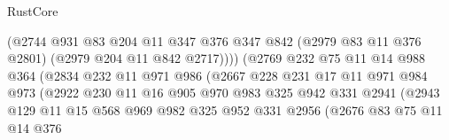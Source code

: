 \begin{lexlean}{RustCore}
\begin{coremodule}
                                    (@2744
                                      @931
                                      @83
                                      @204
                                      @11
                                      @347
                                      @376
                                      @347
                                      @842
                                      (@2979 @83 @11 @376 @2801)
                                      (@2979 @204 @11 @842 @2717))))
                                (@2769
                                  @232
                                  @75
                                  @11
                                  @14
                                  @988
                                  @364
                                  (@2834
                                    @232
                                    @11
                                    @971
                                    @986
                                    (@2667
                                      @228
                                      @231
                                      @17
                                      @11
                                      @971
                                      @984
                                      @973
                                      (@2922
                                        @230
                                        @11
                                        @16
                                        @905
                                        @970
                                        @983
                                        @325
                                        @942
                                        @331
                                        @2941
                                        (@2943
                                          @129
                                          @11
                                          @15
                                          @568
                                          @969
                                          @982
                                          @325
                                          @952
                                          @331
                                          @2956
                                          (@2676
                                            @83
                                            @75
                                            @11
                                            @14
                                            @376

\end{coremodule}
\end{lexlean}
